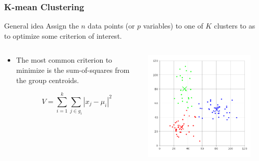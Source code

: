 \documentclass{beamer}
\begin{document}

\begin{frame}
\frametitle{K-mean Clustering}

\begin{block}{General idea}
Assign the $n$ data points (or $p$ variables) to one of $K$ clusters to as to optimize some criterion of interest.    
\end{block}

\begin{columns}
    
\begin{column}{5cm}
\begin{itemize}
\item The most common criterion to minimize is the sum-of-squares from the group centroids.

\[
V = \sum_{i=1}^k \sum_{j \in g_i}|x_j-\mu_i|^2
\]
\end{itemize}
\end{column}

\begin{column}{5.5cm}
\begin{center}
\includegraphics[width=0.9\textwidth]{k-means-simple.png}    
\end{center}
\end{column}

\end{columns}


\end{frame}
\end{document}
